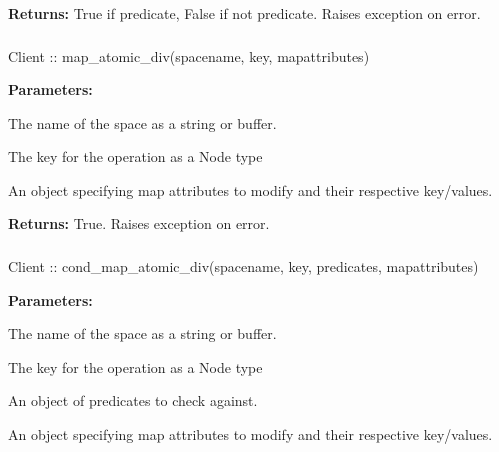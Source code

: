\noindent\textbf{Returns:}
True if predicate, False if not predicate.  Raises exception on error.

\subsubsection{}
\label{api:nodejs:map_atomic_div}
\begin{javascriptcode}
Client :: map_atomic_div(spacename, key, mapattributes)
\end{javascriptcode}
\funcdesc 

\noindent\textbf{Parameters:}
\begin{description}[labelindent=\widthof{{\code{mapattributes}}},leftmargin=*,noitemsep,nolistsep,align=right]
\item[\code{spacename}] The name of the space as a string or buffer.
\item[\code{key}] The key for the operation as a Node type
\item[\code{mapattributes}] An object specifying map attributes to modify and their respective key/values.
\end{description}

\noindent\textbf{Returns:}
True.  Raises exception on error.

\subsubsection{}
\label{api:nodejs:cond_map_atomic_div}
\begin{javascriptcode}
Client :: cond_map_atomic_div(spacename, key, predicates, mapattributes)
\end{javascriptcode}
\funcdesc 

\noindent\textbf{Parameters:}
\begin{description}[labelindent=\widthof{{\code{mapattributes}}},leftmargin=*,noitemsep,nolistsep,align=right]
\item[\code{spacename}] The name of the space as a string or buffer.
\item[\code{key}] The key for the operation as a Node type
\item[\code{predicates}] An object of predicates to check against.
\item[\code{mapattributes}] An object specifying map attributes to modify and their respective key/values.
\end{description}

